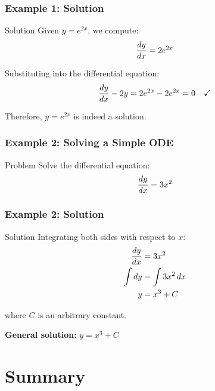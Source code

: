 \begin{frame}
    \frametitle{Example 1: Solution}
    
    \begin{examplebox}{Solution}
        Given $y = e^{2x}$, we compute:
        \[
        \frac{dy}{dx} = 2e^{2x}
        \]
        
        Substituting into the differential equation:
        \[
        \frac{dy}{dx} - 2y = 2e^{2x} - 2e^{2x} = 0 \quad \checkmark
        \]
        
        Therefore, $y = e^{2x}$ is indeed a solution.
    \end{examplebox}
\end{frame}

\begin{frame}
    \frametitle{Example 2: Solving a Simple ODE}
    
    \begin{problembox}{Problem}
        Solve the differential equation:
        \[
        \frac{dy}{dx} = 3x^2
        \]
    \end{problembox}
\end{frame}

\begin{frame}
    \frametitle{Example 2: Solution}
    
    \begin{examplebox}{Solution}
        Integrating both sides with respect to $x$:
        \begin{align*}
            \frac{dy}{dx} &= 3x^2 \\
            \int dy &= \int 3x^2 \, dx \\
            y &= x^3 + C
        \end{align*}
        
        where $C$ is an arbitrary constant.
        
        \vspace{0.3cm}
        
        \textbf{General solution:} $y = x^3 + C$
    \end{examplebox}
\end{frame}

\section{Summary}

